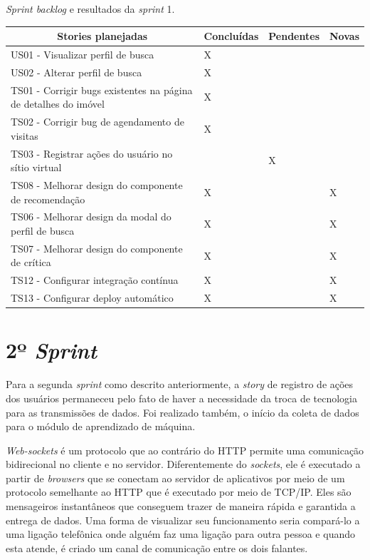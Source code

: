 \begin{quadro}[H]
\centering
\caption[\textit{Sprint backlog} e resultados da \textit{sprint} 1]{\textit{Sprint backlog} e resultados da \textit{sprint} 1.}
\label{quadro:sprint1}
\begin{tabular}{|p{6cm}|p{2cm}|p{2cm}|p{1cm}|}
\hline
\multicolumn{1}{|c|}{\textbf{Stories planejadas}} & \multicolumn{1}{c|}{\textbf{Concluídas}} & \multicolumn{1}{c|}{\textbf{Pendentes}} & \multicolumn{1}{c|}{\textbf{Novas}} \\ \hline
US01 - Visualizar perfil de busca & X &  &  \\ \hline
US02 - Alterar perfil de busca & X &  &  \\ \hline
TS01 - Corrigir bugs existentes na página de detalhes do imóvel & X &  &  \\ \hline
TS02 - Corrigir bug de agendamento de visitas & X &  &  \\ \hline
TS03 - Registrar ações do usuário no sítio virtual &  & X &  \\ \hline
TS08 - Melhorar design do componente de recomendação & X &  & X \\ \hline
TS06 - Melhorar design da modal do perfil de busca & X &  & X \\ \hline
TS07 - Melhorar design do componente de crítica & X &  & X \\ \hline
TS12 - Configurar integração contínua & X &  & X \\ \hline
TS13 - Configurar deploy automático & X &  & X \\ \hline
\end{tabular}
\end{quadro}

\section{2º \textit{Sprint}}
\label{sprint2}

Para a segunda \textit{sprint} como descrito anteriormente, a \textit{story} de registro de ações dos usuários permaneceu pelo fato de haver a necessidade da troca de tecnologia para as transmissões de dados. Foi realizado também, o início da coleta de dados para o módulo de aprendizado de máquina.

\textit{Web-sockets} é um protocolo que ao contrário do HTTP permite uma comunicação bidirecional no cliente e no servidor. Diferentemente do \textit{sockets},
ele é executado a partir de \textit{browsers} que se conectam ao servidor de aplicativos por meio de um protocolo semelhante ao HTTP que é executado por meio de TCP/IP. Eles são mensageiros instantâneos que conseguem trazer de maneira rápida e garantida a entrega de dados. Uma forma de visualizar seu funcionamento seria compará-lo a uma ligação telefônica onde alguém faz uma ligação para outra pessoa e quando esta atende, é criado um canal de comunicação entre os dois falantes. \cite{Carla:2005}

